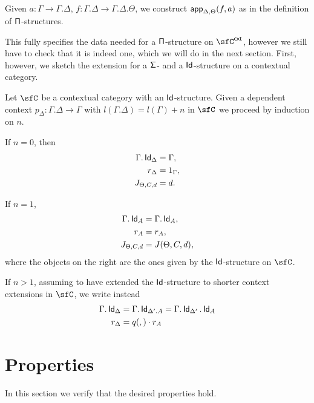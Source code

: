 Given $a\colon\Gamma\rightarrow\Gamma.\Delta$,
$f\colon\Gamma.\Delta\rightarrow\Gamma.\Delta.\Theta$, we construct
$\operatorname{\mathsf{app}}_{\Delta,\Theta}(f,a)$ as in the definition of $\operatorname{\mathsf{\Pi}}$-structures.

This fully specifies the data needed for a $\operatorname{\mathsf{\Pi}}$-structure on $\sfC^{\cxt}$,
however we still have to check that it is indeed one, which we will do in the
next section. First, however, we sketch the extension for a $\operatorname{\mathsf{\Sigma}}$- and a
$\operatorname{\mathsf{Id}}$-structure on a contextual category.

\begin{construction}
  Let $\sfC$ be a contextual category with an $\operatorname{\mathsf{Id}}$-structure. Given a dependent
  context $p_\Delta\colon\Gamma.\Delta\rightarrow\Gamma$ with
  $l(\Gamma.\Delta)=l(\Gamma)+n$ in $\sfC$ we proceed by induction on $n$.

  If $n=0$, then
  \begin{align*}
    \Gamma.\operatorname{\mathsf{Id}}_\Delta &=\Gamma, \\
    r_\Delta &=1_\Gamma, \\
    J_{\Theta,C,d} &=d.
  \end{align*}

  If $n=1$,
  \begin{align*}
    \Gamma.\operatorname{\mathsf{Id}}_A &=\Gamma.\operatorname{\mathsf{Id}}_A, \\
    r_A &=r_A, \\
    J_{\Theta,C,d} &=J(\Theta,C,d),
  \end{align*}
  where the objects on the right are the ones given by the $\operatorname{\mathsf{Id}}$-structure on
  $\sfC$.

  If $n>1$, assuming to have extended the $\operatorname{\mathsf{Id}}$-structure to shorter context
  extensions in $\sfC$, we write instead
  \begin{align*}
    \Gamma.\operatorname{\mathsf{Id}}_{\Delta} &=\Gamma.\operatorname{\mathsf{Id}}_{\Delta'.A}=\Gamma.\operatorname{\mathsf{Id}}_{\Delta'}.\operatorname{\mathsf{Id}}_A \\
    r_{\Delta} &= q(,)\cdot r_A
  \end{align*}
\end{construction}


\section{Properties}

In this section we verify that the desired properties hold.


